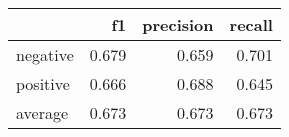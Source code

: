 \begin{tabular}{lrrr}
\toprule
{} &     f1 &  precision &  recall \\
\midrule
negative &  0.679 &      0.659 &   0.701 \\
positive &  0.666 &      0.688 &   0.645 \\
average  &  0.673 &      0.673 &   0.673 \\
\bottomrule
\end{tabular}
